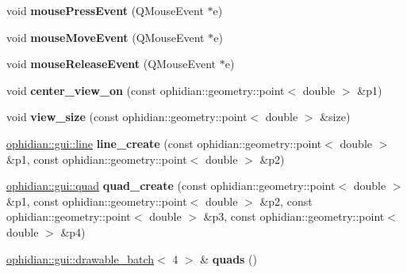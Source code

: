 \begin{DoxyCompactItemize}
\item 
\hypertarget{classuddac2016_1_1mysfmlcanvas_a89c42148155caa8f49c4ca0d287397e0}{void {\bfseries mouse\-Press\-Event} (Q\-Mouse\-Event $\ast$e)}\label{classuddac2016_1_1mysfmlcanvas_a89c42148155caa8f49c4ca0d287397e0}

\item 
\hypertarget{classuddac2016_1_1mysfmlcanvas_abd11990468e9a16db6796ad5688316e7}{void {\bfseries mouse\-Move\-Event} (Q\-Mouse\-Event $\ast$e)}\label{classuddac2016_1_1mysfmlcanvas_abd11990468e9a16db6796ad5688316e7}

\item 
\hypertarget{classuddac2016_1_1mysfmlcanvas_a16a7eb98893c1c0ff2a21fc49d624e7e}{void {\bfseries mouse\-Release\-Event} (Q\-Mouse\-Event $\ast$e)}\label{classuddac2016_1_1mysfmlcanvas_a16a7eb98893c1c0ff2a21fc49d624e7e}

\item 
\hypertarget{classuddac2016_1_1mysfmlcanvas_aee6b4f534bffa4ed0ded4204d42e1e11}{void {\bfseries center\-\_\-view\-\_\-on} (const ophidian\-::geometry\-::point$<$ double $>$ \&p1)}\label{classuddac2016_1_1mysfmlcanvas_aee6b4f534bffa4ed0ded4204d42e1e11}

\item 
\hypertarget{classuddac2016_1_1mysfmlcanvas_a91ff448caa3f74656027bee87da74b97}{void {\bfseries view\-\_\-size} (const ophidian\-::geometry\-::point$<$ double $>$ \&size)}\label{classuddac2016_1_1mysfmlcanvas_a91ff448caa3f74656027bee87da74b97}

\item 
\hypertarget{classuddac2016_1_1mysfmlcanvas_a674de6726155204d428d3220a0c60050}{\hyperlink{structophidian_1_1gui_1_1line}{ophidian\-::gui\-::line} {\bfseries line\-\_\-create} (const ophidian\-::geometry\-::point$<$ double $>$ \&p1, const ophidian\-::geometry\-::point$<$ double $>$ \&p2)}\label{classuddac2016_1_1mysfmlcanvas_a674de6726155204d428d3220a0c60050}

\item 
\hypertarget{classuddac2016_1_1mysfmlcanvas_a96d31fdbf590a181fc8a5e207ecef460}{\hyperlink{structophidian_1_1gui_1_1quad}{ophidian\-::gui\-::quad} {\bfseries quad\-\_\-create} (const ophidian\-::geometry\-::point$<$ double $>$ \&p1, const ophidian\-::geometry\-::point$<$ double $>$ \&p2, const ophidian\-::geometry\-::point$<$ double $>$ \&p3, const ophidian\-::geometry\-::point$<$ double $>$ \&p4)}\label{classuddac2016_1_1mysfmlcanvas_a96d31fdbf590a181fc8a5e207ecef460}

\item 
\hypertarget{classuddac2016_1_1mysfmlcanvas_a05ffc1e2f0d7c0864478d5047aee3fbb}{\hyperlink{classophidian_1_1gui_1_1drawable__batch}{ophidian\-::gui\-::drawable\-\_\-batch}$<$ 4 $>$ \& {\bfseries quads} ()}\label{classuddac2016_1_1mysfmlcanvas_a05ffc1e2f0d7c0864478d5047aee3fbb}


\end{DoxyCompactItemize}
